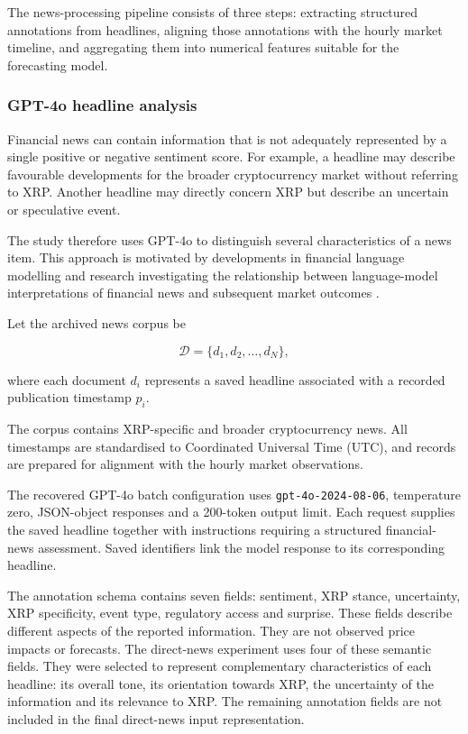 The news-processing pipeline consists of three steps: extracting structured annotations from headlines, aligning those annotations with the hourly market timeline, and aggregating them into numerical features suitable for the forecasting model.

\subsubsection{GPT-4o headline analysis}

Financial news can contain information that is not adequately represented by a single positive or negative sentiment score. For example, a headline may describe favourable developments for the broader cryptocurrency market without referring to XRP. Another headline may directly concern XRP but describe an uncertain or speculative event.

The study therefore uses GPT-4o to distinguish several characteristics of a news item. This approach is motivated by developments in financial language modelling and research investigating the relationship between language-model interpretations of financial news and subsequent market outcomes \citep{Araci2019,LopezLira2023}.

Let the archived news corpus be

\begin{equation}
\mathcal{D}
=
\{d_1,d_2,\ldots,d_N\},
\label{eq:news_corpus}
\end{equation}

where each document $d_i$ represents a saved headline associated with a recorded publication timestamp $p_i$.

The corpus contains XRP-specific and broader cryptocurrency news. All timestamps are standardised to Coordinated Universal Time (UTC), and records are prepared for alignment with the hourly market observations.

The recovered GPT-4o batch configuration uses \texttt{gpt-4o-2024-08-06}, temperature zero, JSON-object responses and a 200-token output limit. Each request supplies the saved headline together with instructions requiring a structured financial-news assessment. Saved identifiers link the model response to its corresponding headline.

The annotation schema contains seven fields: sentiment, XRP stance, uncertainty, XRP specificity, event type, regulatory access and surprise. These fields describe different aspects of the reported information. They are not observed price impacts or forecasts. The direct-news experiment uses four of these semantic fields. They were selected to represent complementary characteristics of each headline: its overall tone, its orientation towards XRP, the uncertainty of the information and its relevance to XRP. The remaining annotation fields are not included in the final direct-news input representation.

